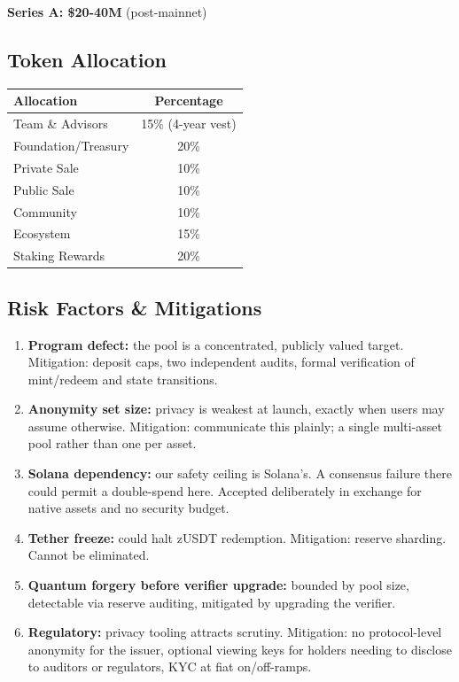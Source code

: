 \documentclass[11pt,a4paper]{article}
\begin{document}
\textbf{Series A: \$20-40M} (post-mainnet)

\subsection{Token Allocation}

\begin{table}[h]
\centering
\begin{tabular}{@{}lc@{}}
\toprule
\textbf{Allocation} & \textbf{Percentage} \\ \midrule
Team \& Advisors & 15\% (4-year vest) \\
Foundation/Treasury & 20\% \\
Private Sale & 10\% \\
Public Sale & 10\% \\
Community & 10\% \\
Ecosystem & 15\% \\
Staking Rewards & 20\% \\ \bottomrule
\end{tabular}
\end{table}

\subsection{Risk Factors \& Mitigations}

\begin{enumerate}[leftmargin=*]
    \item \textbf{Program defect:} the pool is a concentrated, publicly valued target. Mitigation: deposit caps, two independent audits, formal verification of mint/redeem and state transitions.
    \item \textbf{Anonymity set size:} privacy is weakest at launch, exactly when users may assume otherwise. Mitigation: communicate this plainly; a single multi-asset pool rather than one per asset.
    \item \textbf{Solana dependency:} our safety ceiling is Solana's. A consensus failure there could permit a double-spend here. Accepted deliberately in exchange for native assets and no security budget.
    \item \textbf{Tether freeze:} could halt zUSDT redemption. Mitigation: reserve sharding. Cannot be eliminated.
    \item \textbf{Quantum forgery before verifier upgrade:} bounded by pool size, detectable via reserve auditing, mitigated by upgrading the verifier.
    \item \textbf{Regulatory:} privacy tooling attracts scrutiny. Mitigation: no protocol-level anonymity for the issuer, optional viewing keys for holders needing to disclose to auditors or regulators, KYC at fiat on/off-ramps.
\end{enumerate}
\end{document}
